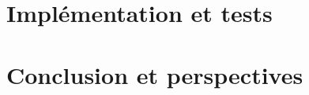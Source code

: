 \documentclass[a4paper,10pt]{report}
\begin{document}
%
%
%
%
%
%

\chapter{Implémentation et tests}
    


\chapter{Conclusion et perspectives}
    
\end{document}
